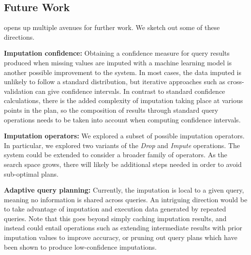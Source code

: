 \subsection{Future Work}
\ProjectName{} opens up multiple avenues for further work. We sketch out some of these
directions.

\textbf{Imputation confidence:} Obtaining a confidence measure for query results
produced when missing values are imputed with a machine learning model is
another possible improvement to the system. In most cases, the data imputed
is unlikely to follow a standard distribution, but iterative approaches such as cross-validation\cite{kohavi1995study}
can give confidence intervals.
In contrast to standard confidence calculations, there is the added complexity
of imputation taking place at various points in the plan, so the composition of results
through standard query operations needs to be taken into account when computing confidence intervals.

\textbf{Imputation operators:} We explored a subset of possible imputation operators.
In particular, we explored two variants of the \textit{Drop} and \textit{Impute} operations. The system
could be extended to consider a broader family of operators. As the search space grows,
there will likely be additional steps needed in order to avoid sub-optimal plans.

\textbf{Adaptive query planning:} Currently, the imputation is local to a given query, meaning
no information is shared across queries. An intriguing direction would be to take advantage
of imputation and execution data generated by repeated queries. Note that this goes beyond
simply caching imputation results, and instead could entail operations such as extending
intermediate results with prior imputation values to improve accuracy, or pruning out
query plans which have been shown to produce low-confidence imputations.

